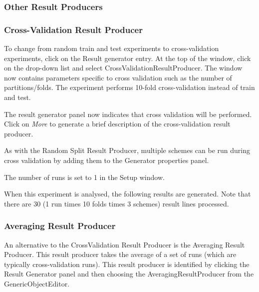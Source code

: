 \documentclass[a4paper]{article}
\begin{document}
\subsubsection{Other Result Producers}

\subsubsection*{Cross-Validation Result Producer}

To change from random train and test experiments to cross-validation experiments, click on the Result generator entry. At the top of the window, click on the drop-down list and select CrossValidationResultProducer. The window now contains parameters specific to cross validation such as the number of partitions/folds. The experiment performs 10-fold cross-validation instead of train and test.
\begin{center}
\end{center}

The result generator panel now indicates that cross validation will be performed. Click on \textit{More} to generate a brief description of the cross-validation result producer.
\begin{center}
\end{center}

As with the Random Split Result Producer, multiple schemes can be run during cross validation by adding them to the Generator properties panel.
\begin{center}
\end{center}

The number of runs is set to 1 in the Setup window.

When this experiment is analysed, the following results are generated. Note that there are 30 (1 run times 10 folds times 3 schemes) result lines processed.
\begin{center}
\end{center}


\subsubsection*{Averaging Result Producer}

An alternative to the CrossValidation Result Producer is the Averaging Result Producer. This result producer takes the average of a set of runs (which are typically cross-validation runs). This result producer is identified by clicking the Result Generator panel and then choosing the AveragingResultProducer from the GenericObjectEditor.
\begin{center}
\end{center}
\end{document}
